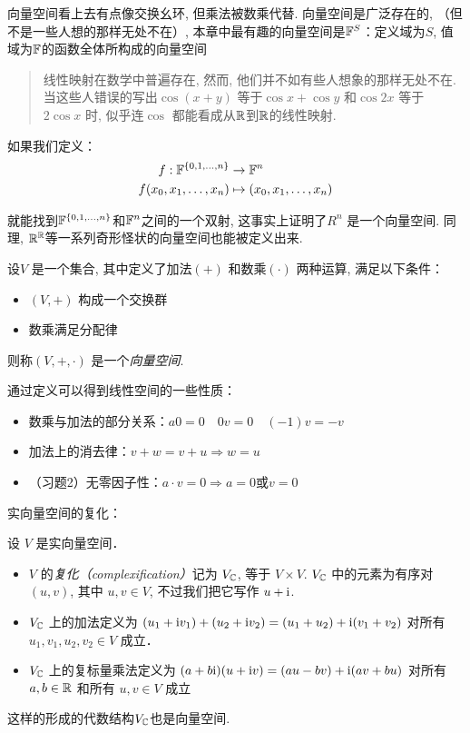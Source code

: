 向量空间看上去有点像交换幺环, 但乘法被数乘代替.
向量空间是广泛存在的, （但不是一些人想的那样无处不在）,
本章中最有趣的向量空间是\(\mathbb{F}^{S}\)：定义域为\(S\),
值域为\(\mathbb{F}\)的函数全体所构成的向量空间
\begin{quote}
    线性映射在数学中普遍存在, 然而, 他们并不如有些人想象的那样无处不在.
    当这些人错误的写出\(\cos(x+y)\) 等于\(\cos x+\cos y\) 和\(\cos 2x\)
    等于 \(2\cos x\) 时, 似乎连\(\cos\)
    都能看成从\(\mathbb{R}\)到\(\mathbb{R}\)的线性映射.
\end{quote}
如果我们定义：
\[
    \begin{aligned}
        f: \mathbb{F}^{\{0,1,\dots,n\}} &\to \mathbb{F}^{n}\\
        f(x_{0}, x_{1}, \dots, x_{n}) &\mapsto (x_{0},
        x_{1}, \dots, x_{n})
    \end{aligned}
\]

就能找到\(\mathbb{F}^{\{0,1,\dots,n\}}\)和\(\mathbb{F}^{n}\)之间的一个双射,
这事实上证明了\(R^{n}\)
是一个向量空间.
同理, \(\mathbb{R}^{\mathbb{R}}\)等一系列奇形怪状的向量空间也能被定义出来.
\begin{definition}
    设\(V\) 是一个集合, 其中定义了加法\((+)\) 和数乘\((\cdot)\) 两种运算, 满足以下条件：
    \begin{itemize}
        \item \((V, +)\) 构成一个交换群
        \item 数乘满足分配律
    \end{itemize}
    则称\((V, +, \cdot)\) 是一个\emph{向量空间}.
\end{definition}

通过定义可以得到线性空间的一些性质：
\begin{itemize}
    \item 数乘与加法的部分关系：\(a0=0\quad 0v=0\quad (-1)v=-v\)
    \item 加法上的消去律：\(v+w=v+u \Rightarrow w=u \)
    \item （习题2）无零因子性：\(a\cdot v=0 \Rightarrow a=0
        \text{或} v=0\)
\end{itemize}

实向量空间的复化：
\begin{definition}
    设 \(V\) 是实向量空间．
    \begin{itemize}
        \item \(V\) 的\emph{复化（complexification）}记为
            \(V_{\mathbb{C}}\), 等于 \(V \times
            V\). \(V_{\mathbb{C}}\)
            中的元素为有序对 \((u, v)\), 其中
            \(u, v \in V\), 不过我们把它写作 \(u + \mathrm{i} \).
        \item \(V_{\mathbb{C}}\) 上的加法定义为
            \((u_1 + \mathrm{i} v_1) + (u_2 + \mathrm{i} v_2) = (u_1 +
            u_2) + \mathrm{i} (v_1 + v_2)\)
            对所有 \(u_1, v_1, u_2, v_2 \in V\) 成立．
        \item \(V_{\mathbb{C}}\) 上的复标量乘法定义为
            \((a + b\mathrm{i}) (u + \mathrm{i} v) =
                (au - bv) +
            \mathrm{i} (av + bu)\)
            对所有 \(a, b \in \mathbb{R}\) 和所有 \(u, v \in V\) 成立
    \end{itemize}
\end{definition}
这样的形成的代数结构\(V_{\mathbb{C}}\)也是向量空间.

